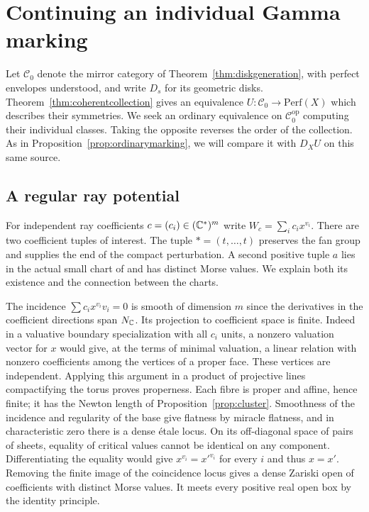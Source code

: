 \section{Continuing an individual Gamma marking}\label{sec:markedpaths}

Let $\mathcal C_0$ denote the mirror category of Theorem~\ref{thm:diskgeneration}, with perfect envelopes understood, and write $D_s$ for its geometric disks. Theorem~\ref{thm:coherentcollection} gives an equivalence $U:\mathcal C_0\to\mathrm{Perf}(X)$ which describes their symmetries. We seek an ordinary equivalence on $\mathcal C_0^{\mathrm{op}}$ computing their individual classes. Taking the opposite reverses the order of the collection. As in Proposition~\ref{prop:ordinarymarking}, we will compare it with $D_X U$ on this same source.

\subsection{A regular ray potential}
For independent ray coefficients $c=(c_i)\in(\mathbb C^*)^m$ write $W_c=\sum_i c_i x^{v_i}$. There are two coefficient tuples of interest. The tuple $*=(t,\ldots,t)$ preserves the fan group and supplies the end of the compact perturbation. A second positive tuple $a$ lies in the actual small chart of \cite[\S3.1]{FZ} and has distinct Morse values. We explain both its existence and the connection between the charts.

The incidence $\sum c_i x^{v_i} v_i=0$ is smooth of dimension $m$ since the derivatives in the coefficient directions span $N_\mathbb C$. Its projection to coefficient space is finite. Indeed in a valuative boundary specialization with all $c_i$ units, a nonzero valuation vector for $x$ would give, at the terms of minimal valuation, a linear relation with nonzero coefficients among the vertices of a proper face. These vertices are independent. Applying this argument in a product of projective lines compactifying the torus proves properness. Each fibre is proper and affine, hence finite; it has the Newton length of Proposition~\ref{prop:cluster}. Smoothness of the incidence and regularity of the base give flatness by miracle flatness, and in characteristic zero there is a dense étale locus. On its off-diagonal space of pairs of sheets, equality of critical values cannot be identical on any component. Differentiating the equality would give $x^{v_i}=x'^{v_i}$ for every $i$ and thus $x=x'$. Removing the finite image of the coincidence locus gives a dense Zariski open of coefficients with distinct Morse values. It meets every positive real open box by the identity principle.

